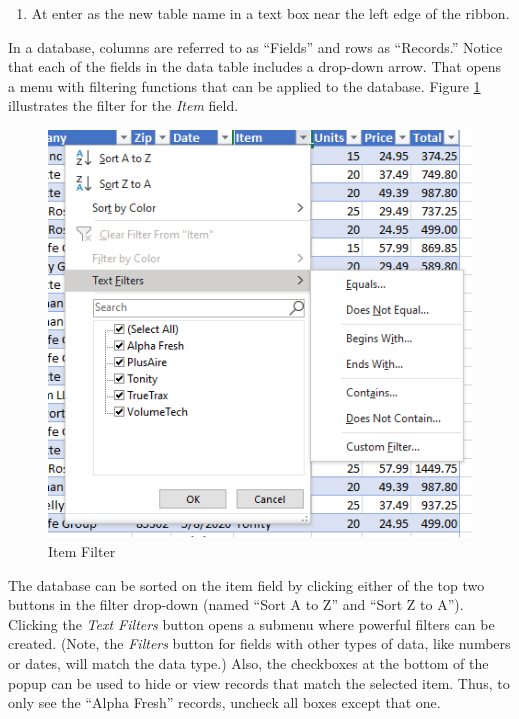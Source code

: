 \begin{enumbox}
	\begin{enumerate}
		\item At  enter  as the new table name in a text box near the left edge of the ribbon.
	\end{enumerate}
\end{enumbox}
	
In a database, columns are referred to as ``Fields'' and rows as ``Records.'' Notice that each of the fields in the data table includes a drop-down arrow. That opens a menu with filtering functions that can be applied to the database. Figure \ref{09:fig12} illustrates the filter for the \textit{Item} field.

\begin{figure}[H]
	\centering
	\includegraphics[width=\maxwidth{.95\linewidth}]{gfx/ch09_fig12}
	\caption{Item Filter}
	\label{09:fig12}
\end{figure}

The database can be sorted on the item field by clicking either of the top two buttons in the filter drop-down (named ``Sort A to Z'' and ``Sort Z to A''). Clicking the \textit{Text Filters} button opens a submenu where powerful filters can be created. (Note, the \textit{Filters} button for fields with other types of data, like numbers or dates, will match the data type.) Also, the checkboxes at the bottom of the popup can be used to hide or view records that match the selected item. Thus, to only see the ``Alpha Fresh'' records, uncheck all boxes except that one.

